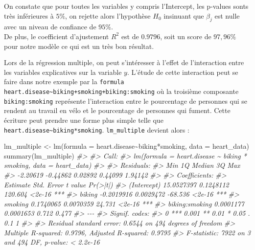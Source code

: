 \documentclass[
]{book}
\newenvironment{Shaded}{\begin{snugshade}}{\end{snugshade}}
\newcommand{\AttributeTok}[1]{\textcolor[rgb]{0.77,0.63,0.00}{#1}}
\newcommand{\CommentTok}[1]{\textcolor[rgb]{0.56,0.35,0.01}{\textit{#1}}}
\newcommand{\FunctionTok}[1]{\textcolor[rgb]{0.00,0.00,0.00}{#1}}
\newcommand{\NormalTok}[1]{#1}
\newcommand{\OtherTok}[1]{\textcolor[rgb]{0.56,0.35,0.01}{#1}}
\newcommand{\SpecialCharTok}[1]{\textcolor[rgb]{0.00,0.00,0.00}{#1}}
\begin{document}
On constate que pour toutes les variables y compris l'Intercept, les p-values sonts très inférieures à \(5\%\), on rejette alors l'hypothèse \(H_0\) insinuant que \(\beta_j\) est nulle avec un niveau de confiance de \(95\%\).\\
De plus, le coefficient d'ajustement \(R^2\) est de \(0.9796\), soit un score de \(97,96\%\) pour notre modèle ce qui est un très bon résultat.

Lors de la régression multiple, on peut s'intéresser à l'effet de l'interaction entre les variables explicatives sur la variable \(y\). L'étude de cette interaction peut se faire dans notre exemple par la \texttt{formula} \texttt{heart.disease\textasciitilde{}biking+smoking+biking:smoking} où la troisième composante \texttt{biking:smoking} représente l'interaction entre le pourcentage de personnes qui se rendent au travail en vélo et le pourcentage de personnes qui fument. Cette écriture peut prendre une forme plus simple telle que \texttt{heart.disease\textasciitilde{}biking*smoking}. \texttt{lm\_multiple} devient alors :

\begin{Shaded}
\begin{Highlighting}[]
\NormalTok{lm\_multiple }\OtherTok{\textless{}{-}} \FunctionTok{lm}\NormalTok{(}\AttributeTok{formula =}\NormalTok{ heart.disease}\SpecialCharTok{\textasciitilde{}}\NormalTok{biking}\SpecialCharTok{*}\NormalTok{smoking, }\AttributeTok{data =}\NormalTok{ heart\_data)}
\FunctionTok{summary}\NormalTok{(lm\_multiple)}
\CommentTok{\#\textgreater{} }
\CommentTok{\#\textgreater{} Call:}
\CommentTok{\#\textgreater{} lm(formula = heart.disease \textasciitilde{} biking * smoking, data = heart\_data)}
\CommentTok{\#\textgreater{} }
\CommentTok{\#\textgreater{} Residuals:}
\CommentTok{\#\textgreater{}      Min       1Q   Median       3Q      Max }
\CommentTok{\#\textgreater{} {-}2.20619 {-}0.44862  0.02892  0.44099  1.94142 }
\CommentTok{\#\textgreater{} }
\CommentTok{\#\textgreater{} Coefficients:}
\CommentTok{\#\textgreater{}                  Estimate Std. Error t value Pr(\textgreater{}|t|)    }
\CommentTok{\#\textgreater{} (Intercept)    15.0527397  0.1248112 120.604   \textless{}2e{-}16 ***}
\CommentTok{\#\textgreater{} biking         {-}0.2019916  0.0029472 {-}68.536   \textless{}2e{-}16 ***}
\CommentTok{\#\textgreater{} smoking         0.1740065  0.0070359  24.731   \textless{}2e{-}16 ***}
\CommentTok{\#\textgreater{} biking:smoking  0.0001177  0.0001653   0.712    0.477    }
\CommentTok{\#\textgreater{} {-}{-}{-}}
\CommentTok{\#\textgreater{} Signif. codes:  }
\CommentTok{\#\textgreater{} 0 \textquotesingle{}***\textquotesingle{} 0.001 \textquotesingle{}**\textquotesingle{} 0.01 \textquotesingle{}*\textquotesingle{} 0.05 \textquotesingle{}.\textquotesingle{} 0.1 \textquotesingle{} \textquotesingle{} 1}
\CommentTok{\#\textgreater{} }
\CommentTok{\#\textgreater{} Residual standard error: 0.6544 on 494 degrees of freedom}
\CommentTok{\#\textgreater{} Multiple R{-}squared:  0.9796, Adjusted R{-}squared:  0.9795 }
\CommentTok{\#\textgreater{} F{-}statistic:  7922 on 3 and 494 DF,  p{-}value: \textless{} 2.2e{-}16}
\end{Highlighting}
\end{Shaded}
\end{document}

